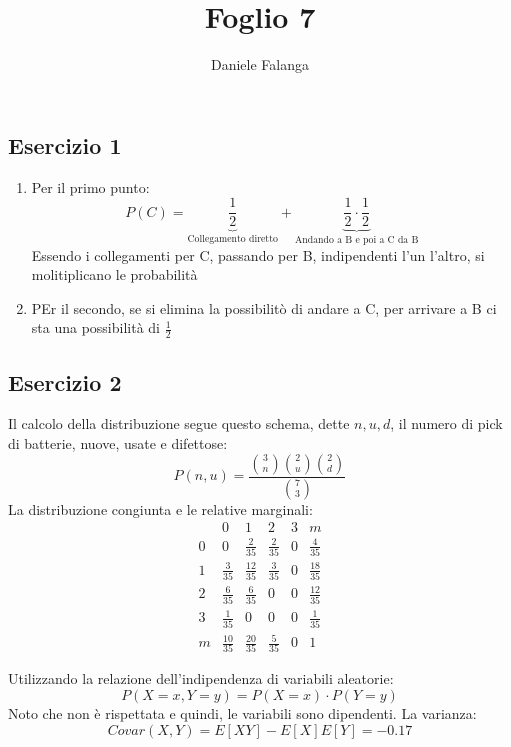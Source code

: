 \documentclass[12pt]{article}
\title{\textbf{Foglio 7}}
\author{Daniele Falanga}
\date{}
\begin{document}
\maketitle

\subsection*{Esercizio 1}

\begin{enumerate}
    \item Per il primo punto:
    \[
    P(C) = \underbrace{\frac{1}{2}}_{\text{Collegamento diretto}} + \underbrace{\frac{1}{2} \cdot \frac{1}{2}}_{\text{Andando a B e poi a C da B}}    
    \]
    Essendo i collegamenti per C, passando per B, indipendenti l'un l'altro, si molitiplicano le probabilità
    \item PEr il secondo, se si elimina la possibilitò di andare a C, per arrivare a B ci sta una possibilità di \(\frac{1}{2}\)
\end{enumerate}

\newpage
\subsection*{Esercizio 2}
Il calcolo della distribuzione segue questo schema, dette \(n,u,d\), il numero di pick di batterie, nuove, usate e difettose:
\[
P(n,u) = \frac{\binom{3}{n} \binom{2}{u} \binom{2}{d}}{\binom{7}{3}}    
\]
La distribuzione congiunta e le relative marginali:
\begin{equation*}
    \renewcommand{\arraystretch}{1.5}
    \begin{array}{c|cccc|c}
          & 0 & 1 & 2 & 3 & m\\
    \hline
    0 & 0 & \frac{2}{35} & \frac{2}{35} & 0 & \frac{4}{35}\\
    1 & \frac{3}{35} & \frac{12}{35} & \frac{3}{35} & 0 & \frac{18}{35} \\
    2 & \frac{6}{35} & \frac{6}{35} & 0 & 0 & \frac{12}{35}\\ 
    3 & \frac{1}{35} & 0 & 0 & 0 & \frac{1}{35}\\
    \hline
    m & \frac{10}{35} & \frac{20}{35} & \frac{5}{35} & 0 & 1 
    \end{array}
\end{equation*}

Utilizzando la relazione dell'indipendenza di variabili aleatorie:
\[
P(X=x,Y=y) = P(X=x)\cdot P(Y=y)    
\]
Noto che non è rispettata e quindi, le variabili sono dipendenti.
La varianza:
\[
Covar(X,Y) = E[XY] - E[X]E[Y] = -0.17    
\] 
\end{document}
